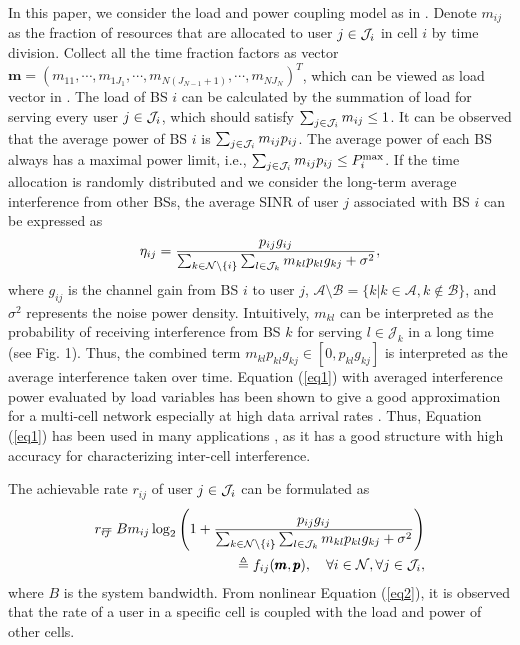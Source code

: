 \documentclass[journal]{IEEEtran}
\begin{document}
In this paper, we consider the load and power coupling model as in \cite{Siomin2012Analysis}.
Denote $m_{ij}$ as the fraction of resources that are allocated to user $j \in {\cal{J}}_i$ in cell $i$ by time division.
Collect all the time fraction factors as vector $\pmb{m}=(m_{11}, \cdots, m_{1J_1}, \cdots, m_{N(J_{N-1}+1)}, \cdots, m_{N J_N})^T$, which can be viewed as load vector in \cite{Siomin2012Analysis}.
The load of BS $i$ can be calculated by the summation of load for serving every user $j \in {\cal{J}}_i$, which should satisfy $\sum_{j \in {\cal{J}}_i }m_{ij} \leq 1$.
It can be observed that the average power of BS $i$ is $\sum_{j \in {\cal{J}}_i }m_{ij} p_{ij}$.
The average power of each BS always has a maximal power limit, i.e., $\sum_{j \in {\cal{J}}_i }m_{ij} p_{ij} \leq P_i^{\max}$.
If the time allocation is randomly distributed and we consider the long-term average interference from other BSs,
the average SINR of user $j$ associated with BS $i$ can be expressed as \cite{Siomin2012Analysis,fehske2012aggregation,siomina2014constrained,ho2014data,siomina2012load,siomina2013optimization,DBLPYouY16}
\begin{equation}\label{eq1}
\eta_{ij}=\frac{p_{ij} g_{ij}} {\sum_{k \in {\cal{N}}\setminus \{i\}} \sum_{l \in {\cal{J}}_k} m_{kl} p_{kl} g_{kj} +\sigma ^2},
\end{equation}
where $g_{ij}$ is the channel gain from BS $i$ to user $j$, $\mathcal A\setminus \mathcal B=\{k|k\in\mathcal A, k \notin \mathcal B\}$, and $\sigma^2$ represents the noise power density.
Intuitively, $m_{kl}$ can be interpreted as the probability of receiving interference from BS $k$ for serving $l \in \mathcal J_k$ in a long time (see Fig. 1).
Thus, the combined term $m_{kl} p_{kl} g_{kj}\in [0, p_{kl} g_{kj}]$ is interpreted as the average interference taken over time.
Equation (\ref{eq1}) with averaged interference power evaluated by load variables has been shown to give a good approximation for a multi-cell network especially at high data arrival rates \cite{fehske2012aggregation}.
Thus, Equation (\ref{eq1}) has been used in many applications \cite{siomina2014constrained,ho2014data,siomina2012load,siomina2013optimization,DBLPYouY16},
as it has a good structure with high accuracy for characterizing inter-cell interference.

The achievable rate $r_{ij}$ of user $j \in {\cal{J}}_i$ can be formulated as
\begin{eqnarray}\label{eq2}
r_{ij}&&\!\!\!\!\!\!\!\!\!\!
=B m_{ij}\log_2\left(1+ \frac{p_{ij} g_{ij}} {\sum_{k \in {\cal{N}}\setminus \{i\}} \sum_{l \in {\cal{J}}_k} m_{kl} p_{kl} g_{kj} +\sigma ^2} \right)
\nonumber\\
&&\!\!\!\!\!\!\!\!\!\!
\triangleq f_{ij}(\pmb{m},\pmb{p}), \quad\forall i  \in {\cal{N}}, \forall j \in {\cal{J}}_i,
\end{eqnarray}
where $B$ is the system bandwidth.
From nonlinear Equation (\ref{eq2}), it is observed that the rate of a user in a specific cell is coupled with the load and power of other cells.
\end{document}
